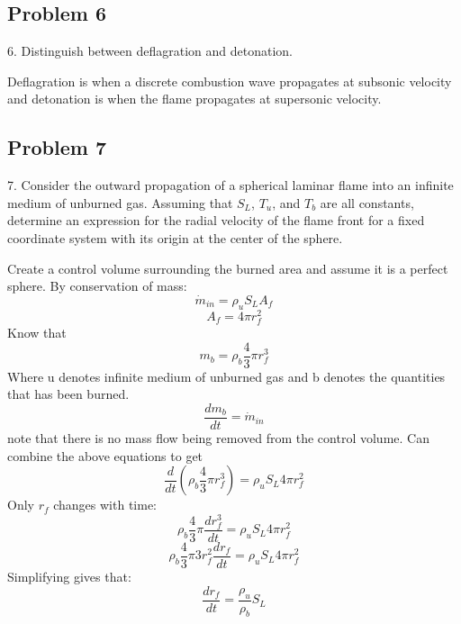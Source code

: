 \documentclass[preview,12pt]{article}
\begin{document}
\begin{center}
    \section*{Problem 6}
\end{center}
6. Distinguish between deflagration and detonation.\newline

Deflagration is when a discrete combustion wave propagates at subsonic velocity and detonation is when the flame propagates at supersonic velocity.
$$$$
\begin{center}
    \section*{Problem 7}
\end{center}
7. Consider the outward propagation of a spherical laminar flame into an infinite medium of unburned gas.  Assuming that $S_L$, $T_u$, and $T_b$ are all constants, determine an expression for the radial velocity of the flame front for a fixed coordinate system with its origin at the center of the sphere.\newline

Create a control volume surrounding the burned area and assume it is a perfect sphere.
By conservation of mass:
$$\dot{m}_{in}=\rho_uS_LA_f$$
$$A_f=4\pi r_f^2$$
Know that
$$m_b=\rho_b\frac{4}{3}\pi r_f^3$$
Where u denotes infinite medium of unburned gas and b denotes the quantities that has been burned.
$$\frac{dm_b}{dt}=\dot{m}_{in}$$
note that there is no mass flow being removed from the control volume. Can combine the above equations to get
$$\frac{d}{dt}(\rho_b\frac{4}{3}\pi r_f^3)=\rho_uS_L4\pi r_f^2$$
Only $r_f$ changes with time:
$$\rho_b\frac{4}{3}\pi \frac{dr_f^3}{dt}=\rho_uS_L4\pi r_f^2$$
$$\rho_b\frac{4}{3}\pi 3r_f^2\frac{dr_f}{dt}=\rho_uS_L4\pi r_f^2$$
Simplifying gives that:
$$\frac{dr_f}{dt}=\frac{\rho_u}{\rho_b}S_L$$
$$$$
\end{document}
